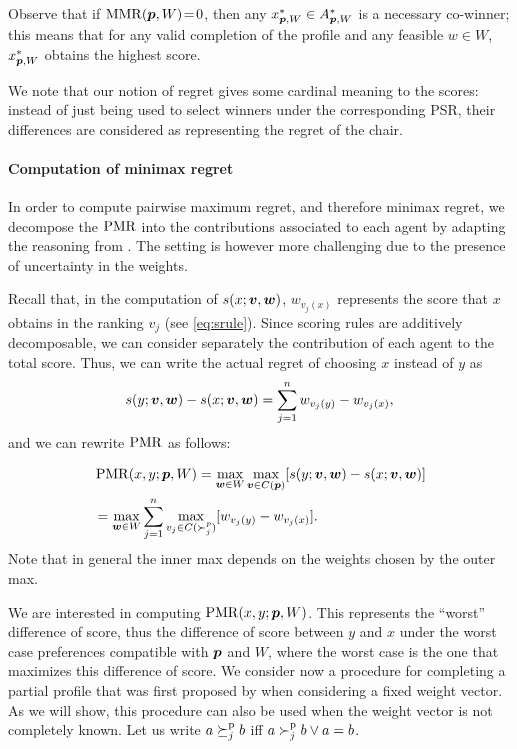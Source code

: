 \documentclass{article}
\begin{document}
Observe that if $\operatorname{MMR}({\bm{p}}, W)\!=\!0$, then any $x^{*}_{{\bm{p}},W} \in A^*_{{\bm{p}}, W}$ is a necessary co-winner; this means that for any valid completion of the profile and any feasible $w \in W$, $x^{*}_{{\bm{p}},W}$ obtains the highest score.

We note that our notion of regret gives some cardinal meaning to the scores: instead of just being used to select winners under the corresponding PSR, their differences are considered as representing the regret of the chair.


\paragraph{Computation of minimax regret}
In order to compute pairwise maximum regret, and therefore minimax regret, we decompose the $\operatorname{PMR}$ into the contributions associated to each agent by adapting the reasoning from \citet{Lu2011}.
The setting is however more challenging due to the presence of uncertainty in the weights.

Recall that, in the computation of $s(x; \bm{v}, \bm{w})$, $w_{v_j(x)}$ represents the score that $x$ obtains in the ranking $v_j$ (see \cref{eq:srule}).
Since scoring rules are additively decomposable, we can consider separately the contribution of each agent to the total score. Thus, we can write the actual regret of choosing $x$ instead of $y$ as
\[
s(y; \bm{v},\bm{w}) - s(x; \bm{v}, \bm{w}) = \sum_{j=1}^n w_{v_j(y)} - w_{v_j(x)},
\]
and we can rewrite $\operatorname{PMR}$ as follows:

\begin{align}
	& \operatorname{PMR}(x,y; {\bm{p}}, W) = \max_{\bm{w} \in W} \max_{\bm{v} \in C({\bm{p}})} [ s(y; \bm{v},\bm{w}) - s(x; \bm{v},\bm{w}) ] \\
	& =  \max_{\bm{w} \in W} \sum_{j=1}^{n} \max_{v_j \in C(\succ_j^p)} [w_{v_j(y)} - w_{v_j(x)}]. \\
\end{align}
Note that in general the inner max depends on the weights chosen by the outer max.

We are interested in computing $\operatorname{PMR}(x, y; {\bm{p}}, W)$. This represents the “worst” difference of score, thus the difference of score between $y$ and $x$ under the worst case preferences compatible with ${\bm{p}}$ and $W$, where the worst case is the one that maximizes this difference of score.
We consider now a procedure for completing a partial profile that was first proposed by \citet{Lu2011} when considering %
a fixed weight vector.
As we will show, this procedure can also be used when the weight vector is not completely known. Let us write $a \succeq^\text{p}_j b$ iff $a \succ^\text{p}_j b \lor a = b$.
\end{document}
